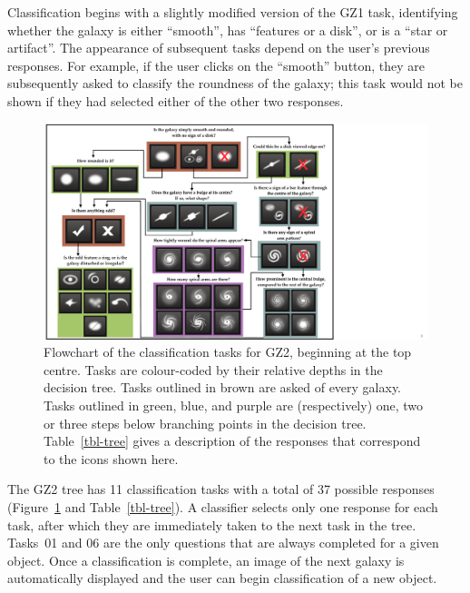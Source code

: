 \documentclass[useAMS,usenatbib]{mn2e}
\begin{document}
Classification begins with a slightly modified version of the GZ1 task, identifying whether the galaxy is either ``smooth'', has ``features or a disk'', or is a ``star or artifact''. The appearance of subsequent tasks depend on the user's previous responses. For example, if the user clicks on the ``smooth'' button, they are subsequently asked to classify the roundness of the galaxy; this task would not be shown if they had selected either of the other two responses. 

\begin{figure}
\includegraphics[angle=0,width=7.0in]{figures/flowchart.pdf}
\caption{Flowchart of the classification tasks for GZ2, beginning at the top centre. Tasks are colour-coded by their relative depths in the decision tree. Tasks outlined in brown are asked of every galaxy. Tasks outlined in green, blue, and purple are (respectively) one, two or three steps below branching points in the decision tree. Table~\ref{tbl-tree} gives a description of the responses that correspond to the icons shown here. 
\label{fig-flowchart}}
\end{figure}

The GZ2 tree has 11 classification tasks with a total of 37 possible responses (Figure~\ref{fig-flowchart} and Table~\ref{tbl-tree}). A classifier selects only one response for each task, after which they are immediately taken to the next task in the tree. Tasks~01 and 06 are the only questions that are always completed for a given object. Once a classification is complete, an image of the next galaxy is automatically displayed and the user can begin classification of a new object. 
\end{document}
